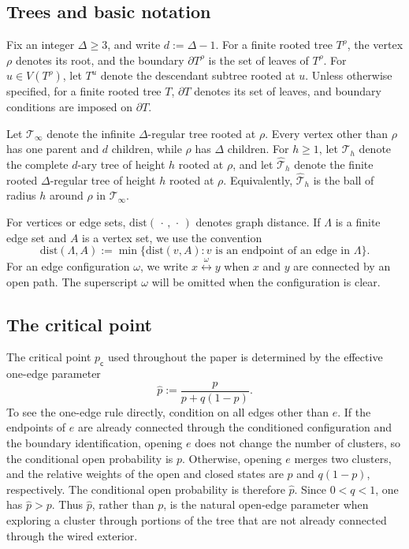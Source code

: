 \documentclass[11pt]{amsart}
\theoremstyle{plain}
\theoremstyle{definition}
\theoremstyle{remark}
\newcommand{\dary}{\mathcal T_h}
\newcommand{\dreg}{\widehat {\mathcal T}_h}
\newcommand{\pc}{p_{\mathsf{c}}}
\newcommand{\dist}{\mathrm{dist}}
\begin{document}
\subsection{Trees and basic notation}

Fix an integer $\Delta\ge3$, and write $d:=\Delta-1$. For a finite rooted tree $T^\rho$, the vertex $\rho$ denotes its root, and the boundary $\partial T^\rho$ is the set of leaves of $T^\rho$. For $u\in V(T^\rho)$, let $T^u$ denote the descendant subtree rooted at $u$. Unless otherwise specified, for a finite rooted tree $T$, $\partial T$ denotes its set of leaves, and boundary conditions are imposed on $\partial T$.

Let $\mathcal T_\infty$ denote the infinite $\Delta$-regular tree rooted at $\rho$. Every vertex other than $\rho$ has one parent and $d$ children, while $\rho$ has $\Delta$ children. For $h\ge1$, let $\dary$ denote the complete $d$-ary tree of height $h$ rooted at $\rho$, and let $\dreg$ denote the finite rooted $\Delta$-regular tree of height $h$ rooted at $\rho$. Equivalently, $\dreg$ is the ball of radius $h$ around $\rho$ in $\mathcal T_\infty$.

For vertices or edge sets, $\dist(\,\cdot\,,\,\cdot\,)$ denotes graph distance. If $\Lambda$ is a finite edge set and $A$ is a vertex set, we use the convention
\[
    \dist(\Lambda,A)
    :=
    \min\bigl\{
        \dist(v,A):
        v\text{ is an endpoint of an edge in }\Lambda
    \bigr\}.
\]
For an edge configuration $\omega$, we write $x\stackrel{\omega}{\longleftrightarrow}y$ when $x$ and $y$ are connected by an open path. The superscript $\omega$ will be omitted when the configuration is clear.

\subsection{The critical point}
\label{subsec:critical-point}

The critical point $\pc$ used throughout the paper is determined by the effective one-edge parameter
\[
    \widehat p
    :=
    \frac{p}{p+q(1-p)}.
\]
To see the one-edge rule directly, condition on all edges other than $e$. If the endpoints of $e$ are already connected through the conditioned configuration and the boundary identification, opening $e$ does not change the number of clusters, so the conditional open probability is $p$. Otherwise, opening $e$ merges two clusters, and the relative weights of the open and closed states are $p$ and $q(1-p)$, respectively. The conditional open probability is therefore $\widehat p$. Since $0<q<1$, one has $\widehat p>p$. Thus $\widehat p$, rather than $p$, is the natural open-edge parameter when exploring a cluster through portions of the tree that are not already connected through the wired exterior.
\end{document}
